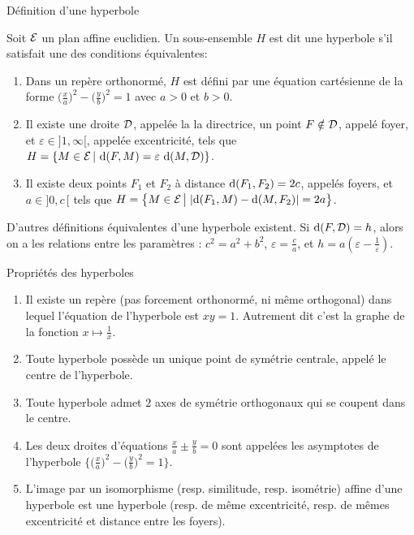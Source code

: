 \documentclass[11pt]{m53beamer}
\begin{document}
\begin{frame}{Définition d'une hyperbole}
  \begin{defprop}
    Soit $\mathcal{E}$ un plan affine euclidien. Un sous-ensemble $H$ est dit une \alert{hyperbole} s'il satisfait une des conditions équivalentes:
    \begin{enumerate}[<+(1)->]
      \item Dans un repère orthonormé, $H$ est défini par une équation cartésienne de la forme $\big(\frac{x}{a}\big)^{2}-\big(\frac{y}{b}\big)^{2}=1$ avec $a>0$ et $b>0$.
      \item Il existe une droite $\mathcal{D}$, appelée la \alert{la directrice}, un point $F \notin \mathcal{D}$, appelé \alert{foyer}, et $\varepsilon \in ]1,\infty[$, appelée \alert{excentricité}, tels que $H = \{ M \in \mathcal{E} \,|\, \operatorname{d}(F,M)=\varepsilon\,\operatorname{d}(M,\mathcal{D})\}$.
      \item Il existe deux points $F_{1}$ et $F_{2}$ à distance $\operatorname{d}(F_{1},F_{2})=2c$, appelés \alert{foyers},  et $a \in ]0,c\,[$ tels que $H = \big\{ M \in \mathcal{E} \,\big|\; |\!\operatorname{d}(F_{1},M)-\operatorname{d}(M,F_{2})|=2a\big\}$.
    \end{enumerate}
  \end{defprop}\pause
  D'autres définitions équivalentes d'une hyperbole existent.\pause{}\newline
  Si $\operatorname{d}(F,\mathcal{D})=h$, alors on a les relations entre les paramètres : $c^{2}=a^{2}+b^{2}$, $\varepsilon =\frac{c}{a}$, et $h=a(\varepsilon-\frac{1}{\varepsilon})$.
\end{frame}
\begin{frame}{Propriétés des hyperboles}
  \begin{enumerate}[<+(1)->]
    \item Il existe un repère (pas forcement orthonormé, ni même orthogonal) dans lequel l'équation de l'hyperbole est $xy=1$. Autrement dit c'est la graphe de la fonction $x\mapsto\frac{1}{x}$.
    \item Toute hyperbole possède un unique point de symétrie centrale, appelé \alert{le centre} de l'hyperbole.
    \item Toute hyperbole admet $2$ axes de symétrie orthogonaux qui se coupent dans le centre.
    \item Les deux droites d'équations $\frac{x}{a}\pm\frac{y}{b}=0$ sont appelées \alert{les asymptotes} de l'hyperbole $\big\{\big(\frac{x}{a}\big)^{2}-\big(\frac{y}{b}\big)^{2}=1\big\}$.
    \item L'image par un isomorphisme (resp. similitude, resp. isométrie) affine d'une hyperbole est une hyperbole (resp. de même excentricité, resp. de mêmes excentricité et distance entre les foyers).
  \end{enumerate}
\end{frame}
\end{document}
